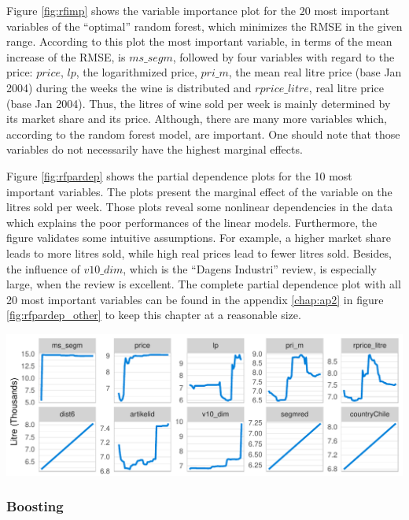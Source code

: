 \documentclass[11pt,]{article}
\let\origfigure\figure
\let\endorigfigure\endfigure
\renewenvironment{figure}[1][2] {
    \expandafter\origfigure\expandafter[H]
} {
    \endorigfigure
}
\begin{document}
Figure \ref{fig:rfimp} shows the variable importance plot for the \(20\)
most important variables of the \enquote{optimal} random forest, which
minimizes the \ac{RMSE} in the given range. According to this plot the
most important variable, in terms of the mean increase of the \ac{RMSE},
is \(ms\_segm\), followed by four variables with regard to the price:
\(price\), \(lp\), the logarithmized price, \(pri\_m\), the mean real
litre price (base Jan 2004) during the weeks the wine is distributed and
\(rprice\_litre\), real litre price (base Jan 2004). Thus, the litres of
wine sold per week is mainly determined by its market share and its
price. Although, there are many more variables which, according to the
random forest model, are important. One should note that those variables
do not necessarily have the highest marginal effects.

Figure \ref{fig:rfpardep} shows the partial dependence plots for the 10
most important variables. The plots present the marginal effect of the
variable on the litres sold per week. Those plots reveal some nonlinear
dependencies in the data which explains the poor performances of the
linear models. Furthermore, the figure validates some intuitive
assumptions. For example, a higher market share leads to more litres
sold, while high real prices lead to fewer litres sold. Besides, the
influence of \(v10\_dim\), which is the \enquote{Dagens Industri}
review, is especially large, when the review is excellent. The complete
partial dependence plot with all 20 most important variables can be
found in the appendix \ref{chap:ap2} in figure \ref{fig:rfpardep_other}
to keep this chapter at a reasonable size.

\begin{figure}
\centering
\includegraphics{../00_data/output_paper/11_par_dep_random_forest.pdf}
\caption{\label{fig:rfpardep}Random Forest: Partial Dependence Plots.}
\end{figure}

\hypertarget{boosting}{%
\subsubsection{Boosting}\label{boosting}}
\end{document}
